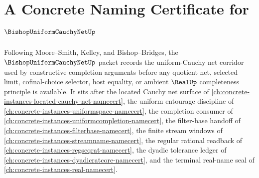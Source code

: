 \chapter{A Concrete Naming Certificate for $\BishopUniformCauchyNetUp$}
\label{ch:concrete-instances-bishop-uniform-cauchy-net-namecert}

Following Moore--Smith, Kelley, and Bishop--Bridges, the $\BishopUniformCauchyNetUp$ packet records the uniform-Cauchy net corridor used by constructive completion arguments before any quotient net, selected limit, cofinal-choice selector, host equality, or ambient $\RealUp$ completeness principle is available. It sits after the located Cauchy net surface of \autoref{ch:concrete-instances-located-cauchy-net-namecert}, the uniform entourage discipline of \autoref{ch:concrete-instances-uniformspace-namecert}, the completion consumer of \autoref{ch:concrete-instances-uniformcompletion-namecert}, the filter-base handoff of \autoref{ch:concrete-instances-filterbase-namecert}, the finite stream windows of \autoref{ch:concrete-instances-streamname-namecert}, the regular rational readback of \autoref{ch:concrete-instances-regseqrat-namecert}, the dyadic tolerance ledger of \autoref{ch:concrete-instances-dyadicratcore-namecert}, and the terminal real-name seal of \autoref{ch:concrete-instances-real-namecert}.

